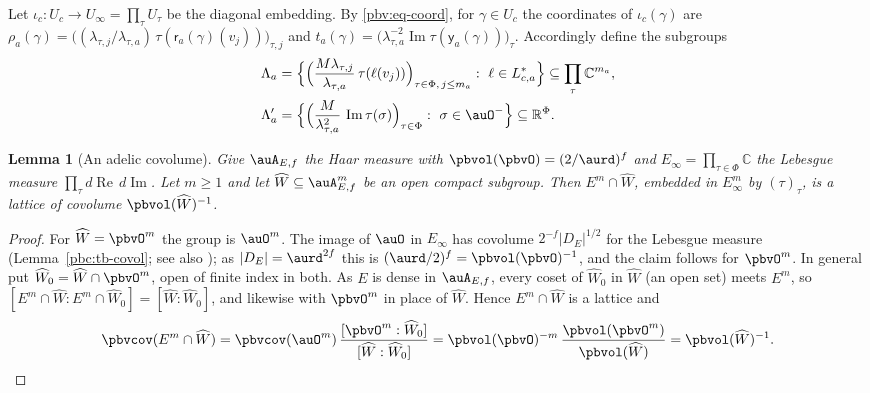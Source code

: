 \documentclass[10pt]{amsart}
\newtheorem{lemma}[theorem]{Lemma}
\theoremstyle{definition}
\theoremstyle{remark}
\newcommand{\C}{\mathbb C}
\newcommand{\R}{\mathbb R}
\newcommand{\Rel}{\operatorname{Re}}
\newcommand{\Iml}{\operatorname{Im}}
\providecommand{\auPl}{\Phi}
\begin{document}
Let $\iota_c\colon U_c\to U_\infty=\prod_\tau U_\tau$ be the diagonal embedding. By \eqref{pbv:eq-coord}, for
$\gamma\in U_c$ the coordinates of $\iota_c(\gamma)$ are $\rho_a(\gamma)=\bigl((\lambda_{\tau,j}/\lambda_{\tau,a})
\,\tau(\mathsf r_a(\gamma)(v_j))\bigr)_{\tau,j}$ and $t_a(\gamma)=\bigl(\lambda_{\tau,a}^{-2}\Iml\tau(\mathsf y_a
(\gamma))\bigr)_\tau$. Accordingly define the subgroups
\begin{align*}
\Lambda_a&=\Bigl\{\Bigl(\frac{M\lambda_{\tau,j}}{\lambda_{\tau,a}}\,\tau(\ell(v_j))\Bigr)_{\tau\in\auPl,\,j\le m_a}:\
\ell\in L_{c,a}^*\Bigr\}\subseteq\prod_\tau\C^{m_a},\\
\Lambda'_a&=\Bigl\{\Bigl(\frac M{\lambda_{\tau,a}^2}\,\Iml\tau(\sigma)\Bigr)_{\tau\in\auPl}:\ \sigma\in\auO^-
\Bigr\}\subseteq\R^{\auPl}.
\end{align*}

\begin{lemma}[An adelic covolume]\label{pbv:adelic}
Give $\auA_{E,f}$ the Haar measure with $\pbvol(\pbvO)=(2/\aurd)^f$ and $E_\infty=\prod_{\tau\in\auPl}\C$ the
Lebesgue measure $\prod_\tau d\Rel\,d\Iml$. Let $m\ge1$ and let $\widehat W\subseteq\auA_{E,f}^m$ be an open
compact subgroup. Then $E^m\cap\widehat W$, embedded in $E_\infty^m$ by $(\tau)_\tau$, is a lattice of
covolume $\pbvol(\widehat W)^{-1}$.
\end{lemma}
\begin{proof}
For $\widehat W=\pbvO^m$ the group is $\auO^m$. The image of $\auO$ in $E_\infty$ has
covolume $2^{-f}|D_E|^{1/2}$ for the Lebesgue measure (Lemma~\ref{pbc:tb-covol}; see also \cite[Chapter~I, (5.1) and Proposition~(5.2)]{Neukirch}); as
$|D_E|=\aurd^{2f}$ this is $(\aurd/2)^f=\pbvol(\pbvO)^{-1}$, and the claim follows for $\pbvO^m$. In general
put $\widehat W_0=\widehat W\cap\pbvO^m$, open of finite index in both. As $E$ is dense in $\auA_{E,f}$,
every coset of $\widehat W_0$ in $\widehat W$ (an open set) meets $E^m$, so $[E^m\cap\widehat W:E^m\cap
\widehat W_0]=[\widehat W:\widehat W_0]$, and likewise with $\pbvO^m$ in place of $\widehat W$. Hence
$E^m\cap\widehat W$ is a lattice and
\[
\pbvcov(E^m\cap\widehat W)=\pbvcov(\auO^m)\,\frac{[\pbvO^m:\widehat W_0]}{[\widehat W:\widehat W_0]}=
\pbvol(\pbvO)^{-m}\,\frac{\pbvol(\pbvO^m)}{\pbvol(\widehat W)}=\pbvol(\widehat W)^{-1}.\qedhere
\]
\end{proof}
\end{document}
